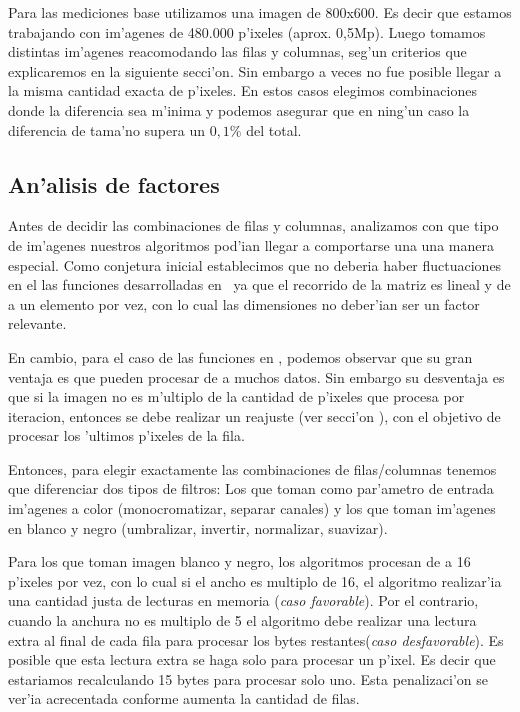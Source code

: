 Para las mediciones base utilizamos una imagen de 800x600. Es decir que estamos trabajando con im'agenes de 480.000 p'ixeles (aprox. 0,5Mp). Luego tomamos distintas im'agenes reacomodando las filas y columnas, seg'un criterios que explicaremos en la siguiente secci'on. Sin embargo a veces no fue posible llegar a la misma cantidad exacta de p'ixeles. En estos casos elegimos combinaciones donde la diferencia sea m'inima y podemos asegurar que en ning'un caso la diferencia de tama'no supera un $0,1\%$ del total.

\subsection{An'alisis de factores}
Antes de decidir las combinaciones de filas y columnas, analizamos con que tipo de im'agenes nuestros algoritmos pod'ian
llegar a comportarse una una manera especial. Como conjetura inicial establecimos que no deberia haber 
fluctuaciones en el las funciones desarrolladas en \C \ ya que el recorrido de la matriz es lineal y
de a un elemento por vez, con lo cual las dimensiones no deber'ian ser un factor relevante. 

En cambio, para el caso de las funciones en \ass, podemos observar que su gran ventaja es que pueden procesar de a muchos datos. Sin embargo su desventaja es que si la imagen no es m'ultiplo de la cantidad de p'ixeles que procesa por iteracion, entonces se debe realizar un reajuste (ver secci'on \label{sec:algoritmos}), con el objetivo de procesar los 'ultimos p'ixeles de la fila.

Entonces, para elegir exactamente las combinaciones de filas/columnas tenemos que diferenciar dos tipos de
filtros: Los que toman como par'ametro de entrada im'agenes a color (monocromatizar, separar canales) y los que toman im'agenes en blanco y negro
(umbralizar, invertir, normalizar, suavizar).

Para los que toman imagen blanco y negro, los algoritmos procesan de a 16 p'ixeles por vez, con lo cual si el ancho es multiplo de 16, el algoritmo realizar'ia una cantidad justa de lecturas en memoria (\textit{caso favorable}). Por el contrario, cuando la anchura no es multiplo de 5 el algoritmo debe realizar una lectura extra al final de cada fila para procesar los bytes restantes(\textit{caso desfavorable}). Es posible que esta lectura extra se haga solo para procesar un p'ixel. Es decir que estariamos recalculando 15 bytes para procesar solo uno. Esta penalizaci'on se ver'ia acrecentada conforme aumenta la cantidad de filas.

